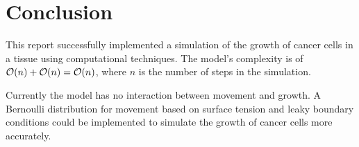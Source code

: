 \chapter{Conclusion}

This report successfully implemented a simulation of the growth of cancer cells in a tissue using computational techniques.
The model's complexity is of $\mathcal{O}(n) + \mathcal{O}(n) = \mathcal{O}(n)$, where $n$ is the number of steps in the simulation.


Currently the model has no interaction between movement and growth.
A Bernoulli distribution for movement based on surface tension and leaky boundary conditions could be implemented to simulate the growth of cancer cells more accurately.

